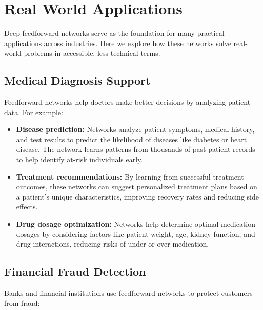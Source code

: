 
\section{Real World Applications}
\label{sec:feedforward-real-world}

Deep feedforward networks serve as the foundation for many practical applications across industries. Here we explore how these networks solve real-world problems in accessible, less technical terms.

\subsection{Medical Diagnosis Support}

Feedforward networks help doctors make better decisions by analyzing patient data. For example:

\begin{itemize}
    \item \textbf{Disease prediction:} Networks analyze patient symptoms, medical history, and test results to predict the likelihood of diseases like diabetes or heart disease. The network learns patterns from thousands of past patient records to help identify at-risk individuals early.
    
    \item \textbf{Treatment recommendations:} By learning from successful treatment outcomes, these networks can suggest personalized treatment plans based on a patient's unique characteristics, improving recovery rates and reducing side effects.
    
    \item \textbf{Drug dosage optimization:} Networks help determine optimal medication dosages by considering factors like patient weight, age, kidney function, and drug interactions, reducing risks of under or over-medication.
\end{itemize}

\subsection{Financial Fraud Detection}

Banks and financial institutions use feedforward networks to protect customers from fraud:


